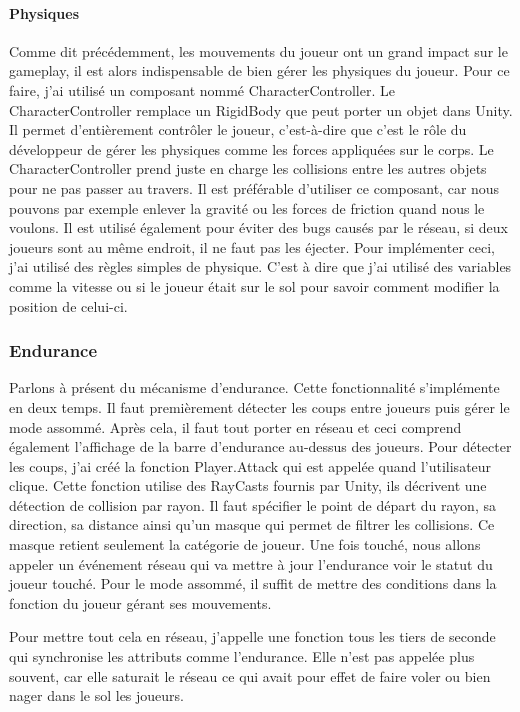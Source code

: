 \documentclass{article}
\begin{document}
\paragraph{Physiques}


Comme dit précédemment, les mouvements du joueur ont un grand impact sur le gameplay, il est alors indispensable de bien gérer les physiques du joueur.
Pour ce faire, j'ai utilisé un composant nommé CharacterController. Le CharacterController remplace un RigidBody que peut porter un objet dans Unity. Il permet d'entièrement contrôler le joueur, c'est-à-dire que c'est le rôle du développeur de gérer les physiques comme les forces appliquées sur le corps. Le CharacterController prend juste en charge les collisions entre les autres objets pour ne pas passer au travers. Il est préférable d'utiliser ce composant, car nous pouvons par exemple enlever la gravité ou les forces de friction quand nous le voulons. Il est utilisé également pour éviter des bugs causés par le réseau, si deux joueurs sont au même endroit, il ne faut pas les éjecter.
Pour implémenter ceci, j'ai utilisé des règles simples de physique. C'est à dire que j'ai utilisé des variables comme la vitesse ou si le joueur était sur le sol pour savoir comment modifier la position de celui-ci.


\subsubsection{Endurance}


Parlons à présent du mécanisme d'endurance.
Cette fonctionnalité s'implémente en deux temps. Il faut premièrement détecter les coups entre joueurs puis gérer le mode assommé. Après cela, il faut tout porter en réseau et ceci comprend également l'affichage de la barre d'endurance au-dessus des joueurs. Pour détecter les coups, j'ai créé la fonction Player.Attack qui est appelée quand l'utilisateur clique. Cette fonction utilise des RayCasts fournis par Unity, ils décrivent une détection de collision par rayon. Il faut spécifier le point de départ du rayon, sa direction, sa distance ainsi qu'un masque qui permet de filtrer les collisions. Ce masque retient seulement la catégorie de joueur. Une fois touché, nous allons appeler un événement réseau qui va mettre à jour l'endurance voir le statut du joueur touché.
Pour le mode assommé, il suffit de mettre des conditions dans la fonction du joueur gérant ses mouvements.


Pour mettre tout cela en réseau, j'appelle une fonction tous les tiers de seconde qui synchronise les attributs comme l'endurance.
Elle n'est pas appelée plus souvent, car elle saturait le réseau ce qui avait pour effet de faire voler ou bien nager dans le sol les joueurs.
\end{document}
